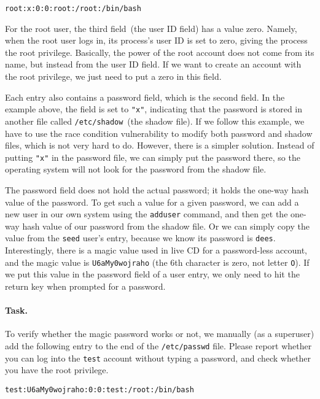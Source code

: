 \begin{lstlisting}
root:x:0:0:root:/root:/bin/bash
\end{lstlisting}

For the root user, the third field~(the user ID field) has a value zero. Namely, when the root
user logs in, its process's user ID is set to zero, giving the process the root privilege.
Basically, the power of the root account does not come from its name, but instead from
the user ID field. If we want to create an account with the root privilege,
we just need to put a zero in this field.


Each entry also contains a password field, which is the second field. In the example above, the
field is set to \texttt{"x"}, indicating that the password is stored in another file called
\texttt{/etc/shadow}~(the shadow file). If we follow this example, we have to use the race condition
vulnerability to modify both password and shadow files, which is not
very hard to do. However, there is a simpler solution. Instead of putting \texttt{"x"} in the
password file, we can simply put the password there, so the operating system will not look for
the password from the shadow file.

The password field does not hold the actual password; it holds the one-way hash value of the
password. To get such a value for a given password, we can add a new user in our own system using
the \texttt{adduser} command, and then get the one-way hash value of our password from
the shadow file.  Or we can simply copy the value from the \texttt{seed} user's entry,
because we know its password is \texttt{dees}. Interestingly, there is a magic value
used in \ubuntu live CD for a password-less account, and the magic value is
\texttt{U6aMy0wojraho} (the 6th character is zero, not letter \texttt{O}). If we put this value
in the password field of a user entry, we only need to hit the return key when prompted for
a password.


\paragraph{Task.} To verify whether the magic password works or not, we
manually (as a superuser) add the following entry to the end of the \texttt{/etc/passwd} file. 
Please report whether you can log into the \texttt{test} account without
typing a password, and check whether you have the root privilege.

\begin{lstlisting}
test:U6aMy0wojraho:0:0:test:/root:/bin/bash
\end{lstlisting}

